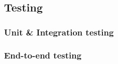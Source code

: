 \subsection{Testing}

\subsubsection{Unit \& Integration testing}



\subsubsection{End-to-end testing}


